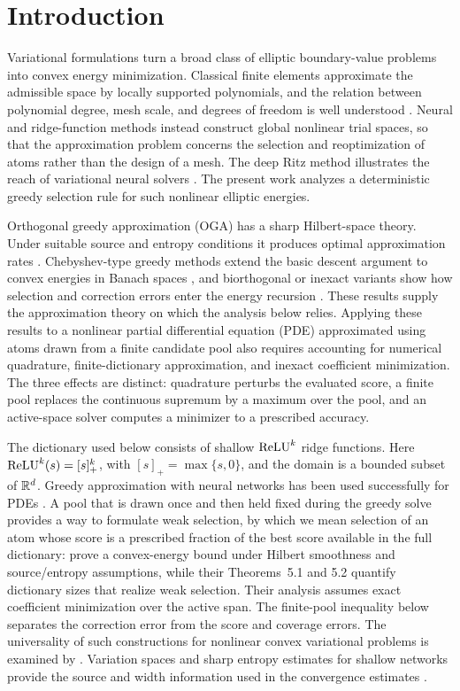 \section{Introduction}
\label{sec:introduction}

Variational formulations turn a broad class of elliptic boundary-value problems into convex energy
minimization. Classical finite elements approximate the admissible space by locally supported
polynomials, and the relation between polynomial degree, mesh scale, and degrees of freedom is well
understood \citep{BrennerScott2008}. Neural and ridge-function methods instead construct global
nonlinear trial spaces, so that the approximation problem concerns the selection and
reoptimization of atoms rather than the design of a mesh. The deep Ritz method illustrates the
reach of variational neural solvers \citep{EYu2018}. The present work analyzes a deterministic
greedy selection rule for such nonlinear elliptic energies.

Orthogonal greedy approximation (OGA) has a sharp Hilbert-space theory. Under suitable source and
entropy conditions it produces optimal approximation rates
\citep{SiegelXuOGA2022,LiSiegelEntropy2024}. Chebyshev-type greedy methods extend the basic descent
argument to convex energies in Banach spaces \citep{TemlyakovCGA2013,TemlyakovGreedy2014}, and
biorthogonal or inexact variants show how selection and correction errors enter the energy recursion
\citep{DereventsovTemlyakov2022}. These results supply the approximation theory on which the analysis
below relies. Applying these results to a nonlinear partial differential equation (PDE)
approximated using atoms drawn from a finite candidate pool also requires
accounting for numerical quadrature, finite-dictionary approximation,
and inexact coefficient minimization. The three effects are distinct: quadrature
perturbs the evaluated score, a finite pool replaces the continuous supremum by a maximum over the
pool, and an active-space solver computes a minimizer to a prescribed accuracy.

The dictionary used below consists of shallow \(\operatorname{ReLU}^k\) ridge functions. Here
\(\operatorname{ReLU}^k(s)=[s]_+^k\), with \([s]_+=\max\{s,0\}\), and the domain is a bounded subset of
\(\mathbb{R}^d\). Greedy approximation with neural networks has been used successfully for PDEs
\citep{SiegelHongJinHaoXu2023}. A pool that is drawn once and then held fixed during the greedy
solve provides a way to formulate weak selection, by which we mean selection of an atom whose score is a
prescribed fraction of the best score available in the full dictionary:
\cite[Theorem~3.1]{XuXu2025} prove a convex-energy bound under Hilbert smoothness and
source/entropy assumptions, while their Theorems~5.1 and 5.2 quantify dictionary sizes that
realize weak selection. Their analysis assumes exact coefficient minimization over the active
span. The finite-pool inequality below separates the correction error from the score and coverage
errors. The universality of such constructions for nonlinear convex variational problems is
examined by \cite{BernaFalco2025}. Variation spaces and sharp entropy estimates for shallow
networks provide the source and width information used in the convergence estimates
\citep{SiegelXuVariation2023,SiegelXuSharp2024,MaoSiegelXu2026}.

